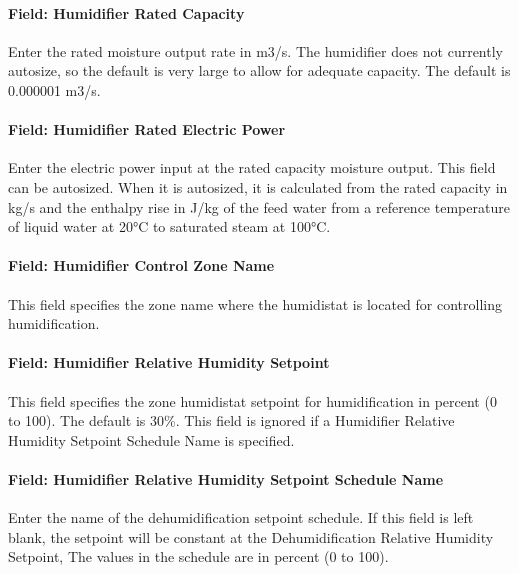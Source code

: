 \paragraph{Field: Humidifier Rated Capacity}\label{field-humidifier-rated-capacity-6}

Enter the rated moisture output rate in m3/s. The humidifier does not currently autosize, so the default is very large to allow for adequate capacity. The default is 0.000001 m3/s.

\paragraph{Field: Humidifier Rated Electric Power}\label{field-humidifier-rated-electric-power-6}

Enter the electric power input at the rated capacity moisture output. This field can be autosized. When it is autosized, it is calculated from the rated capacity in kg/s and the enthalpy rise in J/kg of the feed water from a reference temperature of liquid water at 20°C to saturated steam at 100°C.

\paragraph{Field: Humidifier Control Zone Name}\label{field-humidifier-control-zone-name-6}

This field specifies the zone name where the humidistat is located for controlling humidification.

\paragraph{Field: Humidifier Relative Humidity Setpoint}\label{field-humidifier-relative-humidity-setpoint-2}

This field specifies the zone humidistat setpoint for humidification in percent (0 to 100). The default is 30\%. This field is ignored if a Humidifier Relative Humidity Setpoint Schedule Name is specified.

\paragraph{Field: Humidifier Relative Humidity Setpoint Schedule Name}\label{field-humidifier-relative-humidity-setpoint-schedule-name-2}

Enter the name of the dehumidification setpoint schedule. If this field is left blank, the setpoint will be constant at the Dehumidification Relative Humidity Setpoint, The values in the schedule are in percent (0 to 100).

